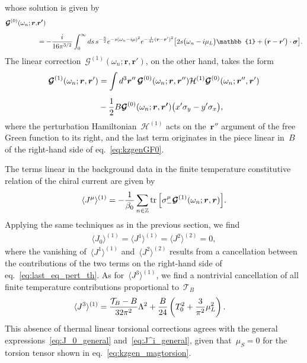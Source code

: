 \documentclass[11pt,a4paper]{article}
\begin{document}
whose solution is given by
\begin{align}
\boldsymbol{\mathcal{G}}^{(0)}(\omega_{n};\boldsymbol{r},&\boldsymbol{r'})  
\label{eq:GF_zero_order}\\[0.2cm]
&=-{i\over 16\pi^{3/2}}\int_{0}^{\infty}ds\,s^{-{5\over 2}}e^{-s(\omega_{n}-i\mu)^{2}}
e^{-{1\over 4s}(\boldsymbol{r}-\boldsymbol{r}')^{2}}
\big[2s\big(\omega_{n}-i\mu_{L}\big)\mathbb{1}+\big(\boldsymbol{r}-\boldsymbol{r}'\big)
\cdot\boldsymbol{\sigma}\big].
\nonumber
\end{align}
The linear correction~$\boldsymbol{\mathcal{G}}^{(1)}(\omega_{n};\boldsymbol{r},\boldsymbol{r}')$, on the other hand,
takes the form
\begin{align}
\boldsymbol{\mathcal{G}}^{(1)}(\omega_{n};\boldsymbol{r},\boldsymbol{r}')
&=\int d^{3}\boldsymbol{r}''\,\boldsymbol{\mathcal{G}}^{(0)}(\omega_{n};\boldsymbol{r},\boldsymbol{r}'')
\mathcal{H}^{(1)}\boldsymbol{\mathcal{G}}^{(0)}(\omega_{n};\boldsymbol{r}'',\boldsymbol{r}')
\nonumber \\[0.2cm]
&-{1\over 2}B\boldsymbol{\mathcal{G}}^{(0)}(\omega_{n};\boldsymbol{r},\boldsymbol{r'})
\big(x'\sigma_{y}-y'\sigma_{x}\big),
\label{eq:last_eq_pert_th}
\end{align}
where the perturbation Hamiltonian~$\mathcal{H}^{(1)}$ 
acts on the~$\boldsymbol{r}''$ argument of the free Green function to its right, and the 
last term originates in the piece linear in~$B$ of 
the right-hand side of eq.~\eqref{eq:kzgenGF0}. 

The terms linear in the background data in the finite temperature constitutive relation of the
chiral current are given by
\begin{align}
\langle J^{\mu}\rangle^{(1)}=-{1\over\beta_{0}}\sum_{n\in\mathbb{Z}}{\rm tr\,}\Big[\sigma^{\mu}_{-}
\boldsymbol{\mathcal{G}}^{(1)}(\omega_{n};\boldsymbol{r},\boldsymbol{r})\Big].
\end{align}
Applying the same techniques as in the previous section, we find
\begin{align}
\langle J_{0}\rangle^{(1)}=\langle J^{1}\rangle^{(1)}=\langle J^{2}\rangle^{(2)}=0,
\label{eq:kzgen_J0(1)final}
\end{align}
where the vanishing of~$\langle J^{1}\rangle^{(1)}$ and~$\langle J^{2}\rangle^{(2)}$ results from a cancellation 
between the contributions of the two terms on the right-hand side of eq.~\eqref{eq:last_eq_pert_th}.
As for~$\langle J^{3}\rangle^{(1)}$, we find 
a nontrivial cancellation of all finite temperature contributions proportional to~$\mathcal{T}_{B}$
\begin{align}
\langle J^{3}\rangle^{(1)}&={\mathcal{T}_{B}-B\over 32\pi^{2}}\Lambda^{2}
+{B\over 24}\left(T_{0}^{2}+{3\over \pi^{2}}\mu_{L}^{2}\right).
\label{eq:kzgen_J3(1)final}
\end{align}
This absence of thermal linear torsional corrections
agrees with 
the general expressions~\eqref{eq:J_0_general} and~\eqref{eq:J^i_general}, 
given that~$\mu_{S}=0$ for the torsion tensor shown in
eq.~\eqref{eq:kzgen_magtorsion}.
\end{document}
